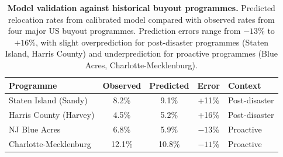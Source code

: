 \documentclass[11pt,letterpaper]{article}
\theoremstyle{definition}
\begin{document}

\begin{table}[p]
\centering
\caption{\textbf{Model validation against historical buyout programmes.} Predicted relocation rates from calibrated model compared with observed rates from four major US buyout programmes. Prediction errors range from $-13$\% to $+16$\%, with slight overprediction for post-disaster programmes (Staten Island, Harris County) and underprediction for proactive programmes (Blue Acres, Charlotte-Mecklenburg).}
\label{tab:validation}
\begin{tabular}{lcccl}
\toprule
Programme & Observed & Predicted & Error & Context \\
\midrule
Staten Island (Sandy) & 8.2\% & 9.1\% & +11\% & Post-disaster \\
Harris County (Harvey) & 4.5\% & 5.2\% & +16\% & Post-disaster \\
NJ Blue Acres & 6.8\% & 5.9\% & $-13$\% & Proactive \\
Charlotte-Mecklenburg & 12.1\% & 10.8\% & $-11$\% & Proactive \\
\bottomrule
\end{tabular}
\end{table}
\end{document}
